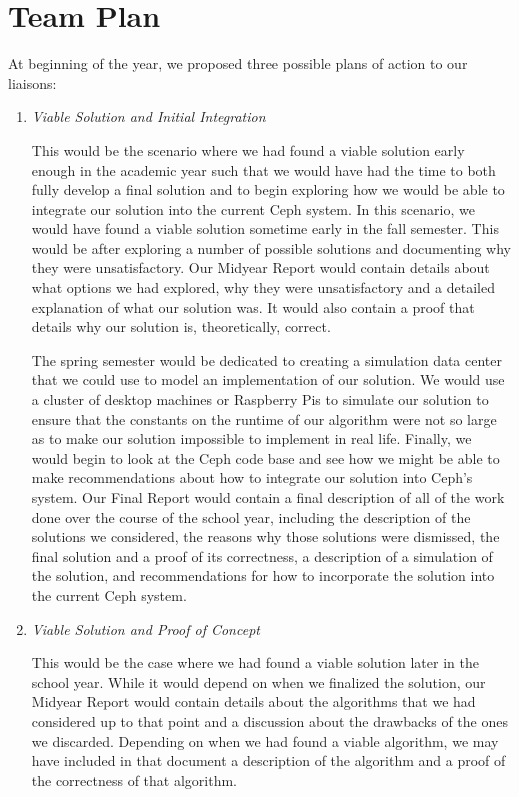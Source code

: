 \chapter{Team Plan}
\label{sec:plan}

At beginning of the year, we proposed three possible plans of action
to our liaisons:

\begin{enumerate}

\item \emph{Viable Solution and Initial Integration}

  This would be the scenario where we had found a viable solution
  early enough in the academic year such that we would have had the
  time to both fully develop a final solution and to begin exploring
  how we would be able to integrate our solution into the current Ceph
  system. In this scenario, we would have found a viable solution
  sometime early in the fall semester. This would be after exploring a
  number of possible solutions and documenting why they were
  unsatisfactory. Our Midyear Report would contain details about what
  options we had explored, why they were unsatisfactory and a detailed
  explanation of what our solution was. It would also contain a proof
  that details why our solution is, theoretically, correct.

  The spring semester would be dedicated to creating a simulation data
  center that we could use to model an implementation of our
  solution. We would use a cluster of desktop machines or Raspberry
  Pis to simulate our solution to ensure that the constants on the
  runtime of our algorithm were not so large as to make our solution
  impossible to implement in real life. Finally, we would begin to
  look at the Ceph code base and see how we might be able to make
  recommendations about how to integrate our solution into Ceph's
  system. Our Final Report would contain a final description of all of
  the work done over the course of the school year, including the
  description of the solutions we considered, the reasons why those
  solutions were dismissed, the final solution and a proof of its
  correctness, a description of a simulation of the solution, and
  recommendations for how to incorporate the solution into the current
  Ceph system.


\item \emph{Viable Solution and Proof of Concept}

  This would be the case where we had found a viable solution later in
  the school year. While it would depend on when we finalized the
  solution, our Midyear Report would contain details about the
  algorithms that we had considered up to that point and a discussion
  about the drawbacks of the ones we discarded. Depending on when we
  had found a viable algorithm, we may have included in that document
  a description of the algorithm and a proof of the correctness of
  that algorithm.


\end{enumerate}
